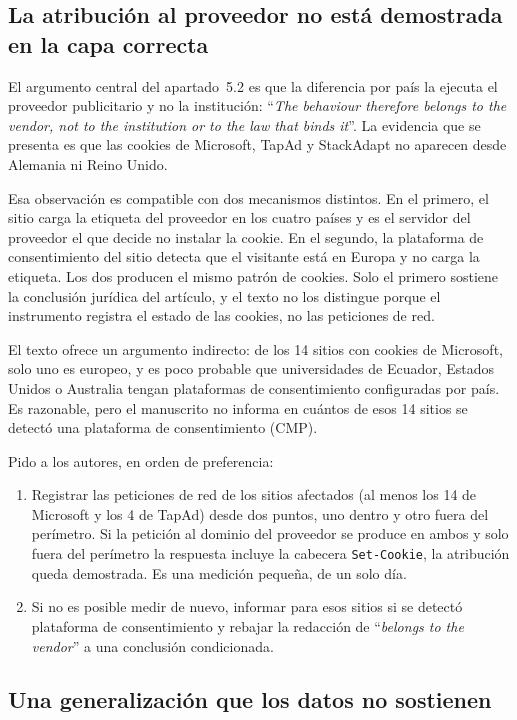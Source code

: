 \documentclass[11pt,a4paper]{article}
\newcommand{\cita}[1]{``\textit{#1}''}
\begin{document}
\subsection{La atribuci\'on al proveedor no est\'a demostrada en la capa correcta}\label{sec:capa}

El argumento central del apartado~5.2 es que la diferencia por pa\'is la ejecuta el proveedor publicitario y no la instituci\'on: \cita{The behaviour therefore belongs to the vendor, not to the institution or to the law that binds it}. La evidencia que se presenta es que las cookies de Microsoft, TapAd y StackAdapt no aparecen desde Alemania ni Reino Unido.

Esa observaci\'on es compatible con dos mecanismos distintos. En el primero, el sitio carga la etiqueta del proveedor en los cuatro pa\'ises y es el servidor del proveedor el que decide no instalar la cookie. En el segundo, la plataforma de consentimiento del sitio detecta que el visitante est\'a en Europa y no carga la etiqueta. Los dos producen el mismo patr\'on de cookies. Solo el primero sostiene la conclusi\'on jur\'idica del art\'iculo, y el texto no los distingue porque el instrumento registra el estado de las cookies, no las peticiones de red.

El texto ofrece un argumento indirecto: de los 14 sitios con cookies de Microsoft, solo uno es europeo, y es poco probable que universidades de Ecuador, Estados Unidos o Australia tengan plataformas de consentimiento configuradas por pa\'is. Es razonable, pero el manuscrito no informa en cu\'antos de esos 14 sitios se detect\'o una plataforma de consentimiento (CMP).

Pido a los autores, en orden de preferencia:
\begin{enumerate}
	\item Registrar las peticiones de red de los sitios afectados (al menos los 14 de Microsoft y los 4 de TapAd) desde dos puntos, uno dentro y otro fuera del per\'imetro. Si la petici\'on al dominio del proveedor se produce en ambos y solo fuera del per\'imetro la respuesta incluye la cabecera \texttt{Set-Cookie}, la atribuci\'on queda demostrada. Es una medici\'on peque\~na, de un solo d\'ia.
	\item Si no es posible medir de nuevo, informar para esos sitios si se detect\'o plataforma de consentimiento y rebajar la redacci\'on de \cita{belongs to the vendor} a una conclusi\'on condicionada.
\end{enumerate}

\subsection{Una generalizaci\'on que los datos no sostienen}
\end{document}
